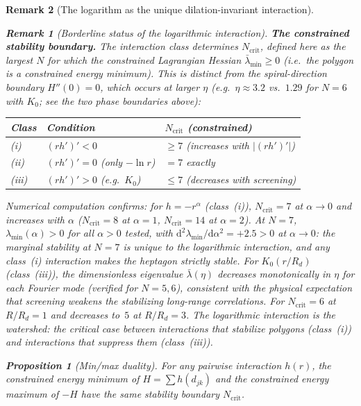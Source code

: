 \documentclass[12pt, a4paper]{article}
\newtheorem{proposition}[theorem]{Proposition}
\newtheorem{remark}{Remark}[section]
\numberwithin{equation}{section}
\newcommand{\dd}{\mathrm{d}}
\begin{document}
\begin{remark}[The logarithm as the unique dilation-invariant interaction]
\begin{remark}[Borderline status of the logarithmic interaction]
\medskip\noindent\textbf{The constrained stability boundary.}
The interaction class determines $N_{\mathrm{crit}}$, defined here as
the largest $N$ for which the \emph{constrained} Lagrangian Hessian
$\bar\lambda_{\min} \ge 0$ (i.e.\ the polygon is a constrained energy
minimum).  This is distinct from the spiral-direction boundary
$H''(0) = 0$, which occurs at larger $\eta$ (e.g.\ $\eta \approx 3.2$
vs.\ $1.29$ for $N = 6$ with $K_0$; see the two phase boundaries above):
\begin{center}
\begin{tabular}{lll}
\toprule
Class & Condition & $N_{\mathrm{crit}}$ (constrained) \\
\midrule
(i) & $(rh')' < 0$ & $\ge 7$ (increases with $|(rh')'|$) \\
(ii) & $(rh')' = 0$ (only $-\ln r$) & $= 7$ exactly \\
(iii) & $(rh')' > 0$ (e.g.\ $K_0$) & $\le 7$
  (decreases with screening) \\
\bottomrule
\end{tabular}
\end{center}
\noindent
Numerical computation confirms: for $h = -r^\alpha$ (class~(i)),
$N_{\mathrm{crit}} = 7$ at $\alpha \to 0$ and increases with $\alpha$
($N_{\mathrm{crit}} = 8$ at $\alpha = 1$, $N_{\mathrm{crit}} = 14$
at $\alpha = 2$).  At $N = 7$, $\lambda_{\min}(\alpha) > 0$ for all
$\alpha > 0$ tested, with
$\dd^2\lambda_{\min}/\dd\alpha^2 = +2.5 > 0$ at $\alpha \to 0$:
the marginal stability at $N = 7$ is \emph{unique to the logarithmic
interaction}, and any class~(i) interaction makes the heptagon strictly
stable.  For $K_0(r/R_d)$ (class~(iii)), the dimensionless eigenvalue
$\bar\lambda(\eta)$ decreases monotonically in $\eta$ for each Fourier
mode (verified for $N = 5, 6$), consistent with the physical expectation
that screening weakens the stabilizing long-range correlations.
For
$N_{\mathrm{crit}} = 6$ at $R/R_d = 1$ and decreases to~$5$ at
$R/R_d = 3$.  The logarithmic interaction is the \emph{watershed}:
the critical case between interactions that stabilize polygons
(class~(i)) and interactions that suppress them (class~(iii)).

\begin{proposition}[Min/max duality]\label{prop:duality}
For any pairwise interaction $h(r)$, the constrained energy minimum
of $H = \sum h(d_{jk})$ and the constrained energy maximum of $-H$
have the same stability boundary $N_{\mathrm{crit}}$.
\end{proposition}


\end{remark}
\end{remark}
\end{document}
